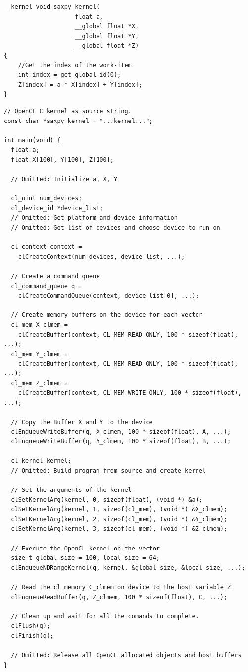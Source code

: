 \begin{lstlisting}[style=CStyle, caption=OpenCL saxpy example (kernel), float, floatplacement=H, label={lst:opencl_kernel_saxpy}]
__kernel void saxpy_kernel(                
                    float a,             
                    __global float *X,       
                    __global float *Y,       
                    __global float *Z)       
{                                          
    //Get the index of the work-item       
    int index = get_global_id(0);          
    Z[index] = a * X[index] + Y[index]; 
}                                          
\end{lstlisting}

\begin{lstlisting}[style=CStyle, caption=OpenCL saxpy example (host), float, floatplacement=H, label={lst:opencl_host_saxpy}]
// OpenCL C kernel as source string.
const char *saxpy_kernel = "...kernel...";

int main(void) {
  float a;
  float X[100], Y[100], Z[100];

  // Omitted: Initialize a, X, Y

  cl_uint num_devices;
  cl_device_id *device_list;
  // Omitted: Get platform and device information
  // Omitted: Get list of devices and choose device to run on

  cl_context context = 
    clCreateContext(num_devices, device_list, ...);

  // Create a command queue
  cl_command_queue q = 
    clCreateCommandQueue(context, device_list[0], ...);

  // Create memory buffers on the device for each vector
  cl_mem X_clmem = 
    clCreateBuffer(context, CL_MEM_READ_ONLY, 100 * sizeof(float), ...);
  cl_mem Y_clmem = 
    clCreateBuffer(context, CL_MEM_READ_ONLY, 100 * sizeof(float), ...);
  cl_mem Z_clmem = 
    clCreateBuffer(context, CL_MEM_WRITE_ONLY, 100 * sizeof(float), ...);

  // Copy the Buffer X and Y to the device
  clEnqueueWriteBuffer(q, X_clmem, 100 * sizeof(float), A, ...);
  clEnqueueWriteBuffer(q, Y_clmem, 100 * sizeof(float), B, ...);

  cl_kernel kernel;
  // Omitted: Build program from source and create kernel

  // Set the arguments of the kernel
  clSetKernelArg(kernel, 0, sizeof(float), (void *) &a);
  clSetKernelArg(kernel, 1, sizeof(cl_mem), (void *) &X_clmem);
  clSetKernelArg(kernel, 2, sizeof(cl_mem), (void *) &Y_clmem);
  clSetKernelArg(kernel, 3, sizeof(cl_mem), (void *) &Z_clmem);

  // Execute the OpenCL kernel on the vector
  size_t global_size = 100, local_size = 64;
  clEnqueueNDRangeKernel(q, kernel, &global_size, &local_size, ...);

  // Read the cl memory C_clmem on device to the host variable Z
  clEnqueueReadBuffer(q, Z_clmem, 100 * sizeof(float), C, ...);

  // Clean up and wait for all the comands to complete.
  clFlush(q);
  clFinish(q);

  // Omitted: Release all OpenCL allocated objects and host buffers
}
\end{lstlisting}

